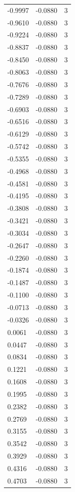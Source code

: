\begin{longtable}{lrr}
  -0.9997 & -0.0880 & 3 \\
  -0.9610 & -0.0880 & 3 \\
  -0.9224 & -0.0880 & 3 \\
  -0.8837 & -0.0880 & 3 \\
  -0.8450 & -0.0880 & 3 \\
  -0.8063 & -0.0880 & 3 \\
  -0.7676 & -0.0880 & 3 \\
  -0.7289 & -0.0880 & 3 \\
  -0.6903 & -0.0880 & 3 \\
  -0.6516 & -0.0880 & 3 \\
  -0.6129 & -0.0880 & 3 \\
  -0.5742 & -0.0880 & 3 \\
  -0.5355 & -0.0880 & 3 \\
  -0.4968 & -0.0880 & 3 \\
  -0.4581 & -0.0880 & 3 \\
  -0.4195 & -0.0880 & 3 \\
  -0.3808 & -0.0880 & 3 \\
  -0.3421 & -0.0880 & 3 \\
  -0.3034 & -0.0880 & 3 \\
  -0.2647 & -0.0880 & 3 \\
  -0.2260 & -0.0880 & 3 \\
  -0.1874 & -0.0880 & 3 \\
  -0.1487 & -0.0880 & 3 \\
  -0.1100 & -0.0880 & 3 \\
  -0.0713 & -0.0880 & 3 \\
  -0.0326 & -0.0880 & 3 \\
  0.0061 & -0.0880 & 3 \\
  0.0447 & -0.0880 & 3 \\
  0.0834 & -0.0880 & 3 \\
  0.1221 & -0.0880 & 3 \\
  0.1608 & -0.0880 & 3 \\
  0.1995 & -0.0880 & 3 \\
  0.2382 & -0.0880 & 3 \\
  0.2769 & -0.0880 & 3 \\
  0.3155 & -0.0880 & 3 \\
  0.3542 & -0.0880 & 3 \\
  0.3929 & -0.0880 & 3 \\
  0.4316 & -0.0880 & 3 \\
  0.4703 & -0.0880 & 3 \\

\end{longtable}
